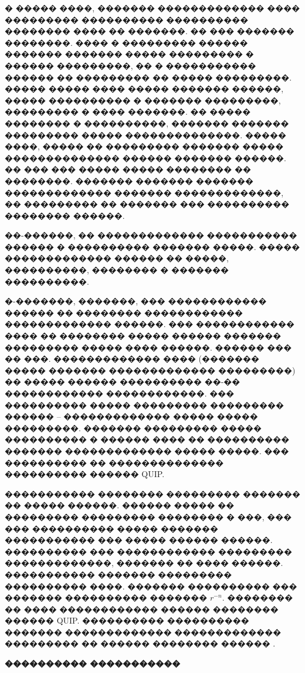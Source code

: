 \documentclass[12pt,titlepage]{article}
\begin{document}
� ����� ����, ������� ������������� ���� ��������� ���������� ���������� �������� ���� �� �������. �� ��� ������� ��������. ���� � ��������� ������ ������� ������� ����� ��������� � ������ ���������, �� � ����������� ������ �� ��������� �� ����� ���������. ����� ����� ���� ����� ������� ������, ����� ���������� � ������� ���������, ��������� � ���� �������. �� ����� �������� � ����������, ������� ������� ��������� ����� ��������������. ����� ����, ����� �� ��������� ������� ����� �������������� ������ ������� ������. �� ��� ��� ����� ����� �������� �� ��������. ������� ������� ������� ������������� ������� �������������, �� ��������� �� ������� ��� ���������� �������� ������.

��-������, �� ������������� ����������� ������ � ���������� ������� �����. ����� ������������� ������ �� �����, ����������, �������� � ������� ����������.

�-�������, �������, ��� ������������ ������ �� �������� ������������ ������������� ������. ��� ������������ ���� �� �������� ����� ������ ������� ��������� ����� ���� ������. ������ ��� �� ���. ������������� ���� (������� ����� ������� ������������� ���������) �� ����� ������ ���������� ��-�� ������������ ������������. ��� ���������� ����� ��������� ��������� ������ -- ������������� ����� ����� ���������. ������� ��������� ����� ���������� � ������ ���� �� ���������� ������� ������������� ����� �����. ��� ���������� �� �������������� ���������� ������ QUIP.

����������� �������� ��������� ������� �� ����� ������. ������ ����� �� ��������� ��������� �������� � ���, ��� ��� ���������� ����� ������� ����������� ��� ����� ������ ������. ���������� ��� ������������ ��������� �������������, ������� �� ���� ������. ����������� ������� ��������� ���������� ����. ������� ���������� ��� ������� ���������� ������� $r^{-n}$. �������� �� ���� ������������ ������ �������� ������ QUIP.
���������� ���������� ������� ������������� ������������� ��������� �� ������ �������� ������ \cite{DAN}.

\bigskip

\textbf{���������� �����������}
\end{document}
